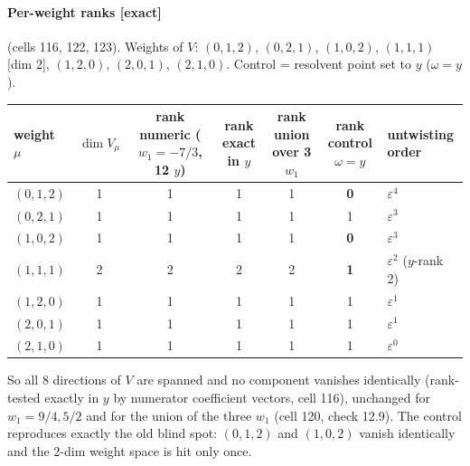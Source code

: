 \documentclass[11pt]{article}
\newcommand{\ex}{\textbf{[exact]}}
\begin{document}
\paragraph{Per-weight ranks \ex} (cells 116, 122, 123). Weights of $V$: $(0,1,2)$, $(0,2,1)$, $(1,0,2)$, $(1,1,1)$ [dim 2], $(1,2,0)$, $(2,0,1)$, $(2,1,0)$. Control = resolvent point set to $y$ ($\omega=y$).
\begin{center}\small
\begin{tabular}{@{}lcccccl@{}}\toprule
weight $\mu$ & $\dim V_\mu$ & rank numeric ($w_1=-7/3$, 12 $y$) & rank exact in $y$ & rank union over 3 $w_1$ & rank control $\omega=y$ & untwisting order\\\midrule
$(0,1,2)$&1&1&1&1&\textbf{0}&$\varepsilon^4$\\
$(0,2,1)$&1&1&1&1&1&$\varepsilon^3$\\
$(1,0,2)$&1&1&1&1&\textbf{0}&$\varepsilon^3$\\
$(1,1,1)$&2&2&2&2&\textbf{1}&$\varepsilon^2$ ($y$-rank 2)\\
$(1,2,0)$&1&1&1&1&1&$\varepsilon^1$\\
$(2,0,1)$&1&1&1&1&1&$\varepsilon^1$\\
$(2,1,0)$&1&1&1&1&1&$\varepsilon^0$\\\bottomrule
\end{tabular}
\end{center}
So all 8 directions of $V$ are spanned and no component vanishes identically (rank-tested exactly in $y$ by numerator coefficient vectors, cell 116), unchanged for $w_1=9/4,5/2$ and for the union of the three $w_1$ (cell 120, check 12.9). The control reproduces exactly the old blind spot: $(0,1,2)$ and $(1,0,2)$ vanish identically and the 2-dim weight space is hit only once.
\end{document}
